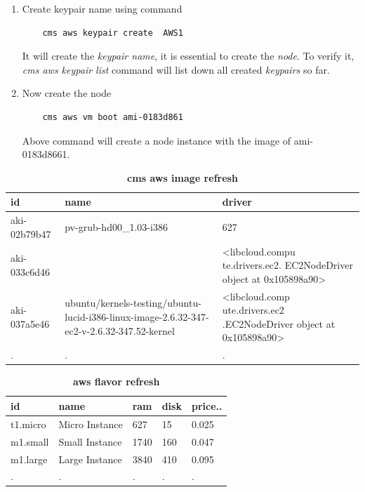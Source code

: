 \documentclass[9pt,twocolumn,twoside]{../../styles/osajnl}
\begin{document}
\begin{enumerate}

\item Create keypair name using command
	
	\begin{verbatim}
	cms aws keypair create  AWS1
	\end{verbatim}
	
  It will create the \textit{keypair name}, it is essential to create
  the \textit{node}. To verify it, \textit{cms aws keypair list}
  command will list down all created \textit{keypairs} so far.
	
\item Now create the node
	
	\begin{verbatim}
	cms aws vm boot ami-0183d861
	\end{verbatim}
	
  Above command will create a node instance with the image of
  ami-0183d8661.

\end{enumerate}	

\begin{table}[h!]
	\caption{\bf cms aws image refresh }
	\begin{tabular}{ | m{1.5cm} | m{3.8cm} | m{2.2cm} |} 
		\hline
		id & name & driver\\
		\hline
		aki-02b79b47  & pv-grub-hd00\_1.03-i386 & 627 \\
		aki-033c6d46 & & <libcloud.compu te.drivers.ec2. EC2NodeDriver object at 0x105898a90>  \\
		aki-037a5e46 & ubuntu/kernels-testing/ubuntu-lucid-i386-linux-image-2.6.32-347-ec2-v-2.6.32-347.52-kernel &  <libcloud.comp ute.drivers.ec2 .EC2NodeDriver object at 0x105898a90>\\
		. & . & .   \\
		\hline
	\end{tabular}
	\label{tab:imagerefresh}
\end{table}

\begin{table}[h!]
	\caption{\bf aws flavor refresh }
	\begin{tabular}{ | m{1.2cm} | m{2.5cm} | m{1.1cm} | m{1.1cm} |m{0.8cm} |} 
		\hline
		id & name & ram & disk & price..\\
		\hline
		t1.micro & Micro Instance & 627 & 15 & 0.025 \\
		m1.small & Small Instance & 1740 & 160 & 0.047 \\
		m1.large & Large Instance & 3840 & 410 & 0.095 \\
		. & . & . & . & . \\
		\hline
	\end{tabular}
	\label{tab:flavorlist}
\end{table}
\end{document}
